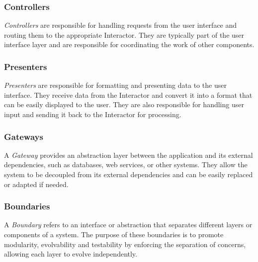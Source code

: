 \subsubsection*{Controllers}
\textit{Controllers} are responsible for handling requests from the user interface and
routing them to the appropriate Interactor. They are typically part of the user interface
layer and are responsible for coordinating the work of other components.

\subsubsection*{Presenters}
\textit{Presenters} are responsible for formatting and presenting data to the user
interface. They receive data from the Interactor and convert it into a format that can be
easily displayed to the user. They are also responsible for handling user input and
sending it back to the Interactor for processing.

\subsubsection*{Gateways}
A \textit{Gateway} provides an abstraction layer between the application and its external
dependencies, such as databases, web services, or other systems. They allow the
system to be decoupled from its external dependencies and can be easily replaced or
adapted if needed.

\subsubsection*{Boundaries}
A \textit{Boundary} refers to an interface or abstraction that separates different layers
or components of a system. The purpose of these boundaries is to promote modularity,
evolvability and testability by enforcing the separation of concerns, allowing each layer
to evolve independently.